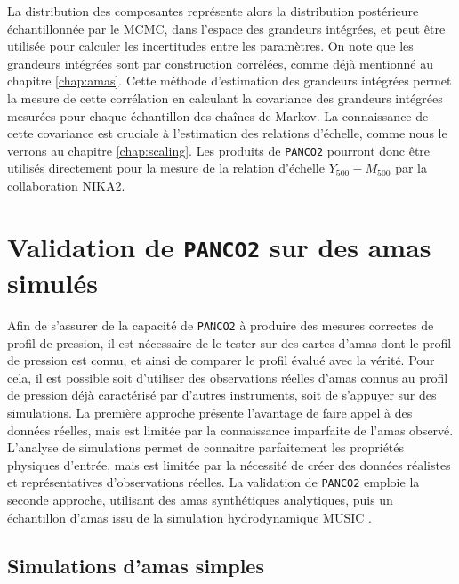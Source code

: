 La distribution des composantes représente alors la distribution postérieure échantillonnée par le MCMC, dans l'espace des grandeurs intégrées, et peut être utilisée pour calculer les incertitudes entre les paramètres.
On note que les grandeurs intégrées sont par construction corrélées, comme déjà mentionné au chapitre \ref{chap:amas}.
Cette méthode d'estimation des grandeurs intégrées permet la mesure de cette corrélation en calculant la covariance des grandeurs intégrées mesurées pour chaque échantillon des chaînes de Markov.
La connaissance de cette covariance est cruciale à l'estimation des relations d'échelle, comme nous le verrons au chapitre \ref{chap:scaling}.
Les produits de \texttt{PANCO2} pourront donc être utilisés directement pour la mesure de la relation d'échelle $Y_{500}-M_{500}$ par la collaboration NIKA2.

\section{Validation de \texttt{PANCO2} sur des amas simulés}
\label{sec:panco:simus}

Afin de s'assurer de la capacité de \texttt{PANCO2} à produire des mesures correctes de profil de pression, il est nécessaire de le tester sur des cartes d'amas dont le profil de pression est connu, et ainsi de comparer le profil évalué avec la vérité.
Pour cela, il est possible soit d'utiliser des observations réelles d'amas connus au profil de pression déjà caractérisé par d'autres instruments, soit de s'appuyer sur des simulations.
La première approche présente l'avantage de faire appel à des données réelles, mais est limitée par la connaissance imparfaite de l'amas observé.
L'analyse de simulations permet de connaitre parfaitement les propriétés physiques d'entrée, mais est limitée par la nécessité de créer des données réalistes et représentatives d'observations réelles.
La validation de \texttt{PANCO2} emploie la seconde approche, utilisant des amas synthétiques analytiques, puis un échantillon d'amas issu de la simulation hydrodynamique MUSIC \cite{sembolini_music_2013}.

\subsection{Simulations d'amas simples} \label{sec:panco:demo}

